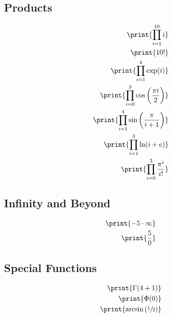 \documentclass[oneside, a4paper]{article}
\begin{document}
\subsection*{Products}
\begin{program}
\begin{align*}
    \print{\prod_{i=1}^{10} i}\\
    \print{10!}\\
    \print{\prod_{i=1}^4 \exp(i)}\\
    \print{\prod_{i=0}^{3}\cos\left(\frac{\pi i}{2}\right)}\\
    \print{\prod_{i=1}^{4} \sin\left(\frac{\pi}{i+1}\right)}\\
    \print{\prod_{i=1}^{3} \ln(i+e)}\\
    \print{\prod_{i=0}^{3} \frac{\pi^i}{i!}}
\end{align*}
\end{program}


\subsection*{Infinity and Beyond}
\begin{program}
\begin{align*}
    \print{-5\cdot \infty}\\
    \print{\frac{5}{0}}
\end{align*}
\end{program}

\subsection*{Special Functions}
\begin{program}
    \begin{align*}
        \print{\Gamma(4+1)}\\
        \print{\Phi(0)}\\
        \print{\arcsin\left(\sfrac{1}{2}\right)}\\
    \end{align*}
\end{program}
\end{document}
